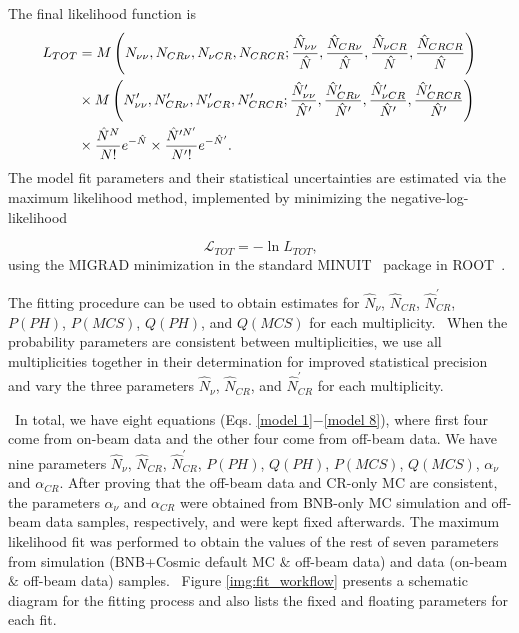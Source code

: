 \documentclass{article}
\begin{document}
The final likelihood function is 
\begin{align}
L_{TOT} & =M\left( N_{\nu\nu},N_{CR\nu},N_{\nu CR},N_{CRCR};\frac{\hat {N}%
_{\nu\nu}}{\hat{N}},\frac{\hat{N}_{CR\nu}}{\hat{N}},\frac{\hat{N}_{\nu CR}}{%
\hat{N}},\frac{\hat{N}_{CRCR}}{\hat{N}}\right) \\
& \times M\left( N_{\nu\nu}^{\prime},N_{CR\nu}^{\prime},N_{\nu CR}^{\prime
},N_{CRCR}^{\prime};\frac{\hat{N}_{\nu\nu}^{\prime}}{\hat{N}^{\prime}},\frac{%
\hat{N}_{CR\nu}^{\prime}}{\hat{N}^{\prime}},\frac{\hat{N}_{\nu CR}^{\prime}}{%
\hat{N}^{\prime}},\frac{\hat{N}_{CRCR}^{\prime}}{\hat{N}^{\prime}}\right)  \notag
\\
& \times\frac{\hat{N}^{N}}{N!}e^{-\hat{N}}\times\frac{\hat{N}^{\prime
N^{\prime}}}{N^{\prime}!}e^{-\hat{N}^{\prime}}.  \notag
\end{align}
The model fit parameters and their statistical uncertainties are estimated via
the maximum likelihood method, implemented by minimizing the
negative-log-likelihood

\begin{equation}
\mathcal{L}_{TOT}=-\ln L_{TOT}\text{,}
\end{equation}
using the MIGRAD minimization in the standard MINUIT~\cite{MINIUT} package in ROOT~\cite{ROOT}.

The fitting procedure can be used to obtain estimates for $\hat{N}_{\nu }$, $%
\hat{N}_{CR}$, $\hat{N}_{CR}^{\prime }$, $P\left( PH\right) $, $P\left(
MCS\right) $, $Q\left( PH\right) $, and $Q\left( MCS\right) $ for each
multiplicity. \ When the probability parameters are consistent between
multiplicities, we use all multiplicities together in their determination
for improved statistical precision and vary the three parameters $\hat{N}%
_{\nu }$, $\hat{N}_{CR}$, and $\hat{N}_{CR}^{\prime }$ for each multiplicity.

\ In total, we have eight equations  (Eqs. \ref{model 1}$-$\ref{model 8}), where first four come from on-beam data and the other four come from off-beam data. We have nine parameters $\hat{N}_{\nu }$, $\hat{N}_{CR}$, $\hat{N}_{CR}^{\prime }$, $P(PH)$, $Q(PH)$, $P(MCS)$, $Q(MCS)$, $\alpha_\nu$ and $\alpha_{CR}$. After proving that the off-beam data and CR-only MC are consistent, the parameters $\alpha_\nu$ and $\alpha_{CR}$ were obtained from BNB-only MC simulation and off-beam data samples, respectively, and were kept fixed afterwards. The maximum likelihood fit was performed to obtain the values of the rest of seven parameters from simulation (BNB+Cosmic default MC $\&$ off-beam data) and data (on-beam $\&$ off-beam data) samples. \ Figure \ref{img:fit_workflow} presents a schematic diagram for the fitting process and also lists the fixed and floating parameters for each fit.
\end{document}
